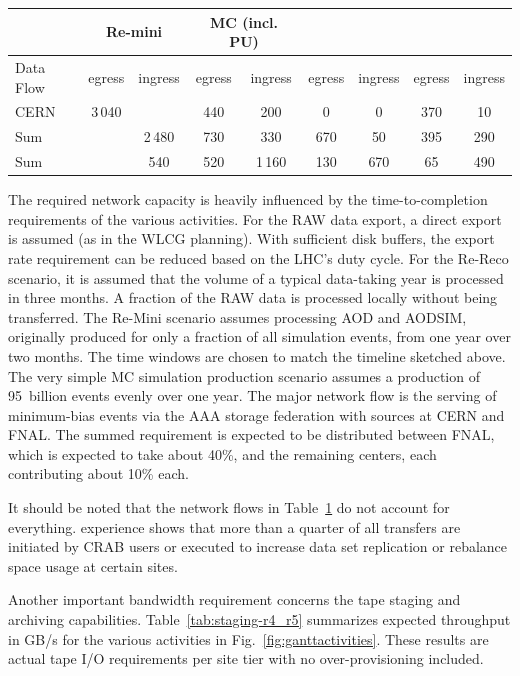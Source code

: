 \begin{table}[tbph]
\begin{tabular}{|l|c|c|c|c|c|c|c|c|}
	                                & \multicolumn{2}{c|}{Re-mini}       & \multicolumn{2}{c|}{MC (incl. PU)} \\ \hline
	\rowcolor{tableheader}  Data Flow        & egress & ingress & egress & ingress & egress & ingress & egress & ingress \\ \hline    
	\cellcolor{tablerowheader}  CERN         & 3\,040 &         &  440   &  200    &   0    &   0     & 370    &  10 \\ \hline
	\cellcolor{tablerowheader}  Sum \TierOne &        & 2\,480  &  730   &  330    & 670    &  50     & 395    & 290 \\ \hline
	\cellcolor{tablerowheader}  Sum \TierTwo &        & 540     &  520   & 1\,160  & 130    & 670     & 65     & 490 \\ \hline
	\end{tabular}
	\label{tab:wan_r4_r5}
\end{table}

The required network capacity is heavily influenced by the time-to-completion requirements of the various activities. 
For the \gls{RAW} data export, a direct export is assumed (as in the \gls{WLCG} planning). With sufficient disk buffers, the export rate requirement can be reduced based on the LHC’s duty cycle. For the Re-Reco scenario, it is assumed that the volume of a typical data-taking year is processed in three months. A fraction of the \gls{RAW} data is processed locally without being transferred. The Re-Mini scenario assumes processing \gls{AOD} and AODSIM, originally produced for only a fraction of all simulation events, from one year over two months. The time windows are chosen to match the timeline sketched above. The very simple \gls{MC} simulation production scenario assumes a production of 95~billion events evenly over one year. The major network flow is the serving of minimum-bias events via the \gls{AAA} storage federation with sources at CERN and \gls{FNAL}. The summed \TierOne requirement is expected to be distributed between \gls{FNAL}, which is expected to take about 40\%, and the remaining \TierOne centers, each contributing about 10\% each.

It should be noted that the network flows in Table~\ref{tab:wan_r4_r5} do not account for everything. \RunThree experience shows that more than a quarter of all transfers are initiated by CRAB users or executed to increase data set replication or rebalance space usage at certain sites.

Another important bandwidth requirement concerns the tape staging and archiving capabilities. Table~\ref{tab:staging-r4_r5} summarizes expected throughput in GB/s for the various activities in Fig.~\ref{fig:ganttactivities}. These results are actual tape I/O requirements per site tier with no over-provisioning included.

